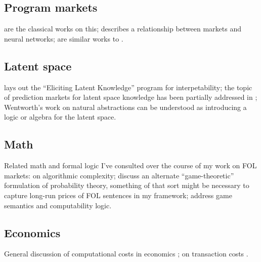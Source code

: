 \documentclass{article}
\begin{document}
\subsection*{Program markets}
\cite{garrabrantLogicalInduction2016, oesterheldTheoryBoundedInductive2023} are the classical works on this; \cite{wentworthCompetitiveMarketsDistributed2018} describes a relationship between markets and neural networks; \cite{ baumModelIntelligenceEconomy1999, changDecentralizedReinforcementLearning2020, kweeMarketBasedReinforcementLearning2001} are similar works to \cite{oesterheldTheoryBoundedInductive2023}.
\newrefcontext[labelprefix=PM]
\printbibliography[filter=progmarkets]

\subsection*{Latent space}
\cite{christianoElicitingLatentKnowledge2021} lays out the ``Eliciting Latent Knowledge'' program for interpetability; the topic of prediction markets for latent space knowledge has been partially addressed in \cite{tailcalledLatentVariablesPrediction2023, baillonBayesianMarketsElicit2017, baillonSimpleBetsElicit2021}; Wentworth's work on natural abstractions \cite{wentworthRulesAlgebraBayes2023, johnswentworthNaturalLatentsMath2023} can be understood as introducing a logic or algebra for the latent space.
\newrefcontext[labelprefix=L]
\printbibliography[filter=latent]

\subsection*{Math}
Related math and formal logic I've consulted over the course of my work on FOL markets: \cite{wuppuluriUnravellingComplexityLife2019} on algorithmic complexity; \cite{shaferGameTheoreticFoundationsProbability2019, shaferProbabilityFinanceIt2005} discuss an alternate ``game-theoretic'' formulation of probability theory, something of that sort might be necessary to capture long-run prices of FOL sentences in my framework; \cite{hintikkaGameTheoreticSemantics1997, boyerProofTruth2012b, bonnayPreuvesJeuxSemantiques2004, japaridzeBeginningWasGame2009, japaridzeSurveyComputabilityLogic2015} address game semantics and computability logic.
\newrefcontext[labelprefix=M]
\printbibliography[filter=math]

\subsection*{Economics}
General discussion of computational costs in economics \cite{normanComputabilityComplexityEconomics1994, rustDealingComplexityEconomic1997, chenEfficiencyComplexityComputational1990}; on transaction costs \cite{barzelTransactionCostsAre1985}.
\newrefcontext[labelprefix=E]
\printbibliography[filter=econ]
\end{document}
